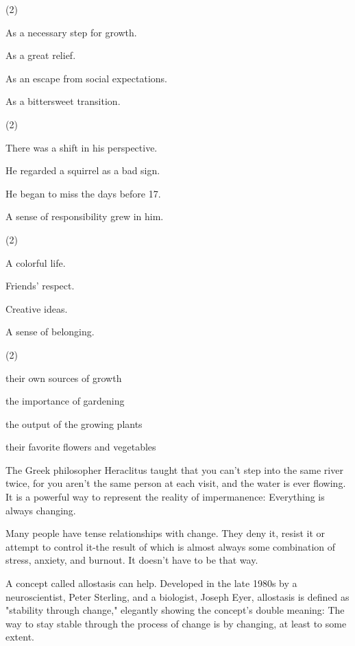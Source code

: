 \documentclass{英语试卷}
\begin{document}
\begin{choices}(2)
  \item As a necessary step for growth.
  \item As a great relief.
  \item As an escape from social expectations.
  \item As a bittersweet transition.
\end{choices}
\begin{choices}(2)
  \item There was a shift in his perspective.
  \item He regarded a squirrel as a bad sign.
  \item He began to miss the days before 17.
  \item A sense of responsibility grew in him.
\end{choices}
\begin{choices}(2)
  \item A colorful life.
  \item Friends' respect.
  \item Creative ideas.
  \item A sense of belonging.
\end{choices}
\begin{choices}(2)
  \item their own sources of growth
  \item the importance of gardening
  \item the output of the growing plants
  \item their favorite flowers and vegetables
\end{choices}
\par The Greek philosopher Heraclitus taught that you can't step into the same river twice, for you aren't the same person at each visit, and the water is ever flowing. It is a powerful way to represent the reality of impermanence: Everything is always changing.\par
\par Many people have tense relationships with change. They deny it, resist it or attempt to control it-the result of which is almost always some combination of stress, anxiety, and burnout. It doesn't have to be that way.\par
\par A concept called allostasis can help. Developed in the late 1980s by a neuroscientist, Peter Sterling, and a biologist, Joseph Eyer, allostasis is defined as "stability through change," elegantly showing the concept's double meaning: The way to stay stable through the process of change is by changing, at least to some extent.\par
\end{document}
